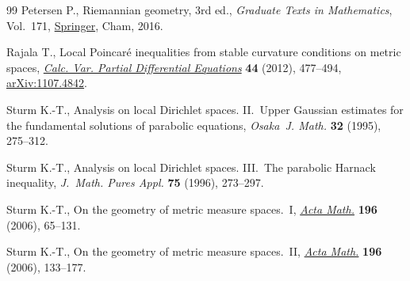 \documentclass[10pt,a4paper]{amsart}
\numberwithin{equation}{section}
\theoremstyle{definition}
\begin{document}
\begin{thebibliography}{99}
Petersen P., Riemannian geometry, 3rd ed., \textit{Graduate Texts in Mathematics}, Vol.~171, \href{https://doi.org/10.1007/978-3-319-26654-1}{Springer}, Cham, 2016.

Rajala T., Local {P}oincar\'e inequalities from stable curvature conditions on
 metric spaces, \href{https://doi.org/10.1007/s00526-011-0442-7}{\textit{Calc. Var. Partial Differential Equations}} \textbf{44}
 (2012), 477--494, \href{https://arxiv.org/abs/1107.4842}{arXiv:1107.4842}.

Sturm K.-T., Analysis on local {D}irichlet spaces. {II}.~{U}pper {G}aussian
 estimates for the fundamental solutions of parabolic equations,
 \textit{Osaka~J. Math.} \textbf{32} (1995), 275--312.

Sturm K.-T., Analysis on local {D}irichlet spaces. {III}.~{T}he parabolic
 {H}arnack inequality, \textit{J.~Math. Pures Appl.} \textbf{75} (1996),
 273--297.

Sturm K.-T., On the geometry of metric measure spaces.~{I}, \href{https://doi.org/10.1007/s11511-006-0002-8}{\textit{Acta Math.}}
 \textbf{196} (2006), 65--131.

Sturm K.-T., On the geometry of metric measure spaces.~{II}, \href{https://doi.org/10.1007/s11511-006-0003-7}{\textit{Acta Math.}}
 \textbf{196} (2006), 133--177.

\end{thebibliography}
\end{document}
